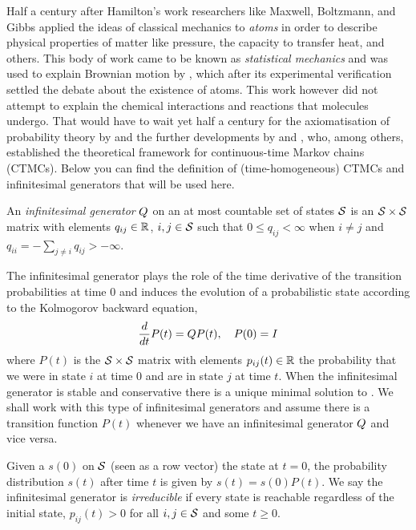 Half a century after Hamilton's work
researchers like Maxwell, Boltzmann, and Gibbs
applied the ideas of classical mechanics to \emph{atoms}
in order to describe physical properties of matter like pressure,
the capacity to transfer heat, and others.
This body of work came to be known as \emph{statistical mechanics}
and was used to explain Brownian motion by \citet{einstein-brownian},
which after its experimental verification \citep{perrin}
settled the debate about the existence of atoms.
This work however did not attempt to explain
the chemical interactions and reactions that molecules undergo.
That would have to wait yet half a century
for the axiomatisation of probability theory by \citet{kolmogorov}
and the further developments by \citet{doob} and \citet{feller},
who, among others, established the theoretical framework
for continuous-time Markov chains (CTMCs).
Below you can find the definition of (time-homogeneous) CTMCs
and infinitesimal generators that will be used here.

\begin{definition}%
  An \emph{infinitesimal generator} $Q$
  on an at most countable set of states $\mathcal{S}$
  is an $\mathcal{S} \times \mathcal{S}$ matrix
  with elements $q_{ij} \in \mathbb{R}$, $i,j \in \mathcal{S}$
  such that $0 \leqslant q_{ij} < \infty$ when $i \neq j$
  and $q_{ii} = - \sum_{j \neq i} q_{ij} > -\infty$.
\end{definition}

The infinitesimal generator plays the role of
the time derivative of the transition probabilities at time $0$
and induces the evolution of a probabilistic state
according to the Kolmogorov backward equation,
\begin{equation}
  \label{eq:transition-function}
  \frac{d}{dt} P(t) = Q P(t), \quad P(0) = I
\end{equation}
where $P(t)$ is the $\mathcal{S} \times \mathcal{S}$ matrix
with elements $p_{ij}(t) \in \mathbb{R}$ the probability that
we were in state $i$ at time $0$ and are in state $j$ at time $t$.
When the infinitesimal generator is stable and conservative
there is a unique minimal solution to 
\citep{anderson}.
We shall work with this type of infinitesimal generators
and assume there is a transition function $P(t)$
whenever we have an infinitesimal generator $Q$ and vice versa.

Given a \pmf $s(0)$ on $\mathcal{S}$ (seen as a row vector)
the state at $t = 0$,
the probability distribution $s(t)$ after time $t$
is given by $s(t) = s(0) P(t)$.
We say the infinitesimal generator is \emph{irreducible}
if every state is reachable regardless of the initial state,
\ie $p_{ij}(t) > 0$ for all $i,j \in \mathcal{S}$
and some $t \geqslant 0$.

